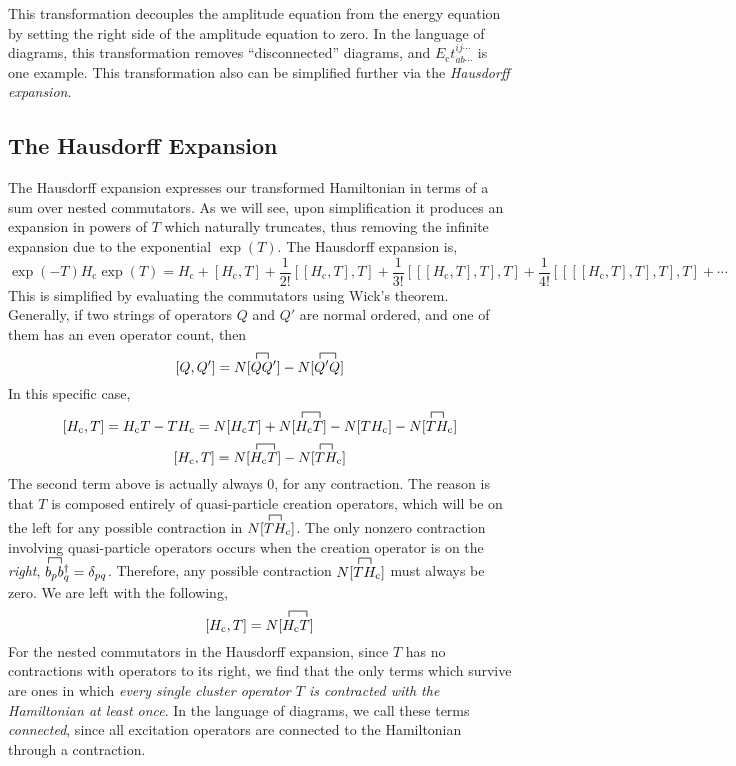 \documentclass{article}
\newcommand{\fctr}{\contraction}
\newcommand{\Ec}{E_{\mathrm{c}}}
\newcommand{\Hc}{H_{\mathrm{c}}}
\begin{document}
This transformation decouples the amplitude equation from the energy equation
by setting the right side of the amplitude equation to zero. 
In the language of diagrams, this transformation removes ``disconnected'' diagrams,
and $\Ec t_{ab \cdots}^{ij \cdots}$ is one example. 
This transformation also can be simplified further via the \textit{Hausdorff expansion}.

\subsection{The Hausdorff Expansion}
The Hausdorff expansion expresses our transformed Hamiltonian in
terms of a sum over nested commutators. As we will see, upon simplification it produces 
an expansion in powers of $T$ which naturally truncates, thus removing the infinite 
expansion due to the exponential $\exp(T)$. 
The Hausdorff expansion is,
\[ \exp(-T) \Hc \exp(T) = \Hc + [\Hc,T] + \frac{1}{2!} [[\Hc,T],T] + 
  \frac{1}{3!} [[[\Hc,T],T],T] +  \frac{1}{4!} [[[[\Hc,T],T],T],T] + \cdots   \]
This is simplified by evaluating the commutators using Wick's theorem.
Generally, if two strings of operators $Q$ and $Q'$ are normal ordered, 
and one of them has an even operator count, then 
\[ [Q, Q'] =  N[\fctr{}{Q}{}{Q} Q Q'] - N[\fctr{}{Q}{'}{Q} Q' Q ] \]
In this specific case, 
\[ [\Hc, T] = \Hc T - T\Hc = N[\Hc T] + N[\fctr{}{H}{{}_\mathrm{c}}{T}H_\mathrm{c}T]
  - N[T \Hc] - N[\fctr{}{T}{}{H} T H_\mathrm{c}] \]
\[ [\Hc, T] =  N[\fctr{}{H}{{}_\mathrm{c}}{T}H_\mathrm{c}T] - N[\fctr{}{T}{}{H} T H_\mathrm{c}] \]
The second term above is actually always 0, for any contraction.  
The reason is that $T$ is composed entirely of quasi-particle creation operators, 
which will be on the left for any possible contraction in $N[\fctr{}{T}{}{H} T H_\mathrm{c}]$.
The only nonzero contraction involving quasi-particle operators occurs
when the creation operator is on the \textit{right}, $ \fctr{}{b}{{}_q}{b} b_p b_q^\dagger = \delta_{pq} $.
Therefore, any possible contraction $N[\fctr{}{T}{}{H} T H_\mathrm{c}]$ must always be zero. 
We are left with the following, 
\[ [\Hc, T] =  N[\fctr{}{H}{{}_\mathrm{c}}{T}H_\mathrm{c}T] \]
For the nested commutators in the Hausdorff expansion, 
since $T$ has no contractions with operators to its right, 
we find that the only terms which survive are ones in which \textit{every single
cluster operator $T$ is contracted with the Hamiltonian at least once}.
In the language of diagrams, we call these terms \textit{connected},
since all excitation operators are connected to the Hamiltonian through a contraction.
\end{document}
